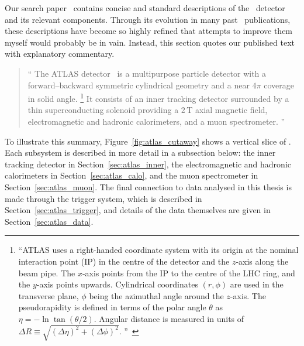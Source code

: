 Our search paper~\cite{atlas2022searches} contains concise and standard
descriptions of the \atlas\ detector and its relevant components.
Through its evolution in many past \atlas\ publications, these descriptions
have become so highly refined that attempts to improve them myself would
probably be in vain.
Instead, this section quotes our published text with explanatory commentary.
\begin{quote}
``%
The ATLAS detector~\cite{atlas2008experiment} is a multipurpose particle
detector with a forward--backward symmetric cylindrical geometry and a near
$4\pi$ coverage in solid angle.%
\footnote{%
``ATLAS uses a right-handed coordinate system with its origin at the nominal
interaction point (IP) in the centre of the detector and the $z$-axis along the
beam pipe.
The $x$-axis points from the IP to the centre of the LHC ring, and the $y$-axis
points upwards.
Cylindrical coordinates $(r,\phi)$ are used in the transverse plane, $\phi$
being the azimuthal angle around the $z$-axis.
The pseudorapidity is defined in terms of the polar angle $\theta$ as
$\eta = -\ln \tan(\theta/2)$.
Angular distance is measured in units of
$\Delta R \equiv \sqrt{(\Delta\eta)^{2} + (\Delta\phi)^{2}}$.%
''\footnotemark~\cite{atlas2022searches}%
}
It consists of an inner tracking detector surrounded by a thin superconducting
solenoid providing a $2\,\mathrm{T}$ axial magnetic field, electromagnetic and
hadronic calorimeters, and a muon spectrometer.%
''~\cite{atlas2022searches}
\end{quote}
To illustrate this summary, Figure~\ref{fig:atlas_cutaway} shows a vertical slice
of \atlas.
Each subsystem is described in more detail in a subsection below:
the inner tracking detector in Section~\ref{sec:atlas_inner},
the electromagnetic and hadronic calorimeters in
Section~\ref{sec:atlas_calo},
and
the muon spectrometer in Section~\ref{sec:atlas_muon}.
The final connection to data analysed in this thesis is made through the
trigger system, which is described in Section~\ref{sec:atlas_trigger},
and details of the data themselves are given in
Section~\ref{sec:atlas_data}.



